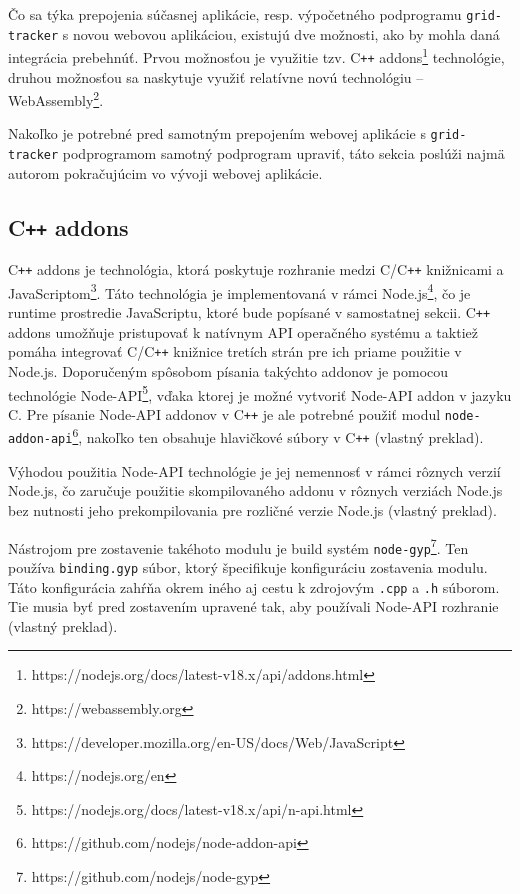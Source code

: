 Čo sa týka prepojenia súčasnej aplikácie, resp. výpočetného podprogramu \texttt{grid-tracker} s novou webovou aplikáciou, existujú dve možnosti, ako by mohla daná integrácia prebehnúť. Prvou možnosťou je využitie tzv. C\texttt{++} addons\footnote{https://nodejs.org/docs/latest-v18.x/api/addons.html} technológie, druhou možnosťou sa naskytuje využiť relatívne novú technológiu -- WebAssembly\footnote{https://webassembly.org}.

Nakoľko je potrebné pred samotným prepojením webovej aplikácie s \texttt{grid-tracker} podprogramom samotný podprogram upraviť, táto sekcia poslúži najmä autorom pokračujúcim vo vývoji webovej aplikácie. 

\subsection {C\texttt{++} addons}
C\texttt{++} addons je technológia, ktorá poskytuje rozhranie medzi C/C\texttt{++} knižnicami a JavaScriptom\footnote{https://developer.mozilla.org/en-US/docs/Web/JavaScript}. Táto technológia je implementovaná v rámci Node.js\footnote{https://nodejs.org/en}, čo je runtime prostredie JavaScriptu, ktoré bude popísané v samostatnej sekcii.
C\texttt{++} addons umožňuje pristupovať k natívnym API operačného systému a taktiež pomáha integrovať C/C\texttt{++} knižnice tretích strán pre ich priame použitie v Node.js. Doporučeným spôsobom písania takýchto addonov je pomocou technológie Node-API\footnote{https://nodejs.org/docs/latest-v18.x/api/n-api.html}, vďaka ktorej je možné vytvoriť Node-API addon v jazyku C. Pre písanie Node-API addonov v C\texttt{++} je ale potrebné použiť modul \texttt{node-addon-api}\footnote{https://github.com/nodejs/node-addon-api}, nakoľko ten obsahuje hlavičkové súbory v C\texttt{++} \cite{cpp_addons} (vlastný preklad).

Výhodou použitia Node-API technológie je jej nemennosť v rámci rôznych verzií Node.js, čo zaručuje použitie skompilovaného addonu v rôznych verziách Node.js bez nutnosti jeho prekompilovania pre rozličné verzie Node.js \cite{cpp_addons} (vlastný preklad).

Nástrojom pre zostavenie takéhoto modulu je build systém \texttt{node-gyp}\footnote{https://github.com/nodejs/node-gyp}. Ten používa \texttt{binding.gyp} súbor, ktorý špecifikuje konfiguráciu zostavenia modulu. Táto konfigurácia zahŕňa okrem iného aj cestu k zdrojovým \texttt{.cpp} a \texttt{.h} súborom. Tie musia byť pred zostavením upravené tak, aby používali Node-API rozhranie \cite{cpp_addons} (vlastný preklad).

